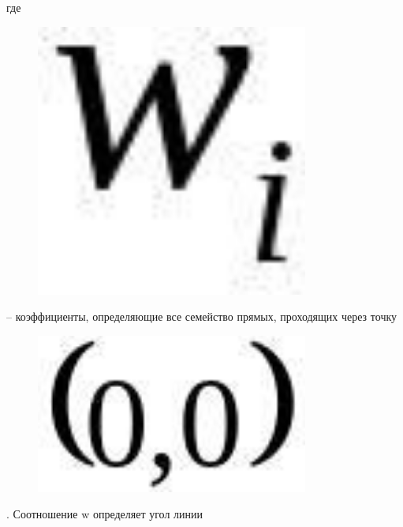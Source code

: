 где \begin{figure}[H]
	\centering
	\includegraphics[width=0.8\textwidth]{assets/87}
	\caption*{}
\end{figure}-- коэффициенты, определяющие все
семейство прямых, проходящих через точку
\begin{figure}[H]
	\centering
	\includegraphics[width=0.8\textwidth]{assets/88}
	\caption*{}
\end{figure}. Соотношение w определяет угол линии
